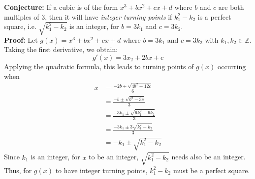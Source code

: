 \documentclass[12pt]{article}
\begin{document}
\textbf{Conjecture:} If a cubic is of the form $x^3 + bx^2 + cx + d$ where $b$ and $c$ are both multiples of $3$, then it will have \textit{integer turning points} if $k_1^2 - k_2$ is a perfect square, i.e. $\sqrt{k_1^2 - k_2}$ is an integer, for $b = 3k_1$ and $c = 3k_2$. \\

\textbf{Proof:} Let $g(x) = x^3 + bx^2 + cx + d$ where $b = 3k_1$ and $c = 3k_2$ with $k_1, k_2 \in \mathbb{Z}$. Taking the first derivative, we obtain:
$$g'(x) = 3x_2 + 2bx + c$$
Applying the quadratic formula, this leads to turning points of $g(x)$ occurring when
\begin{align*}
    x &= \frac{-2b \pm \sqrt{4b^2 - 12c}}{6} \\
    &= \frac{-b \pm \sqrt{b^2 - 3c}}{3} \\
    &= \frac{-3k_1 \pm \sqrt{9k_1^2 - 9k_2}}{3} \\
    &= \frac{-3k_1 \pm 3 \sqrt{k_1^2 - k_2}}{3} \\
    &= -k_1 \pm \sqrt{k_1^2 - k_2}
\end{align*}
Since $k_1$ is an integer, for $x$ to be an integer, $\sqrt{k_1^2 - k_2}$ needs also be an integer. Thus, for $g(x)$ to have integer turning points, $k_1^2 - k_2$ must be a perfect square.\\\\
\end{document}
